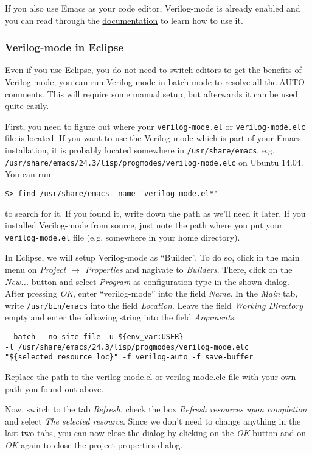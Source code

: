 If you also use Emacs as your code editor,
Verilog-mode is already enabled and you can read through the
\href{http://www.veripool.org/wiki/verilog-mode/Documentation}{documentation} to
learn how to use it.

\subsubsection{Verilog-mode in Eclipse}

Even if you use Eclipse, you do not need to switch editors to get the
benefits of Verilog-mode; you can run Verilog-mode in batch mode to
resolve all the AUTO comments. This will require some manual setup, but
afterwards it can be used quite easily.

First, you need to figure out where your \verb|verilog-mode.el| or
\verb|verilog-mode.elc| file is located. If you want to use the
Verilog-mode which is part of your Emacs installation, it is probably located
somewhere in \verb|/usr/share/emacs|, e.g.
\verb|/usr/share/emacs/24.3/lisp/progmodes/verilog-mode.elc| on Ubuntu 14.04.
You can run
\begin{verbatim}
$> find /usr/share/emacs -name 'verilog-mode.el*'
\end{verbatim}
to search for it. If you found it, write down the path as we'll need it later.
If you installed Verilog-mode from source, just note the path where you put
your \verb|verilog-mode.el| file (e.g. somewhere in your home directory).

In Eclipse, we will setup Verilog-mode as ``Builder''. To do so, click in the
main menu on \emph{Project $\rightarrow$ Properties} and nagivate to
\emph{Builders}. There, click on the \emph{New...} button and select
\emph{Program} as configuration type in the shown dialog. After pressing
\emph{OK}, enter ``verilog-mode'' into the field \emph{Name}. In the \emph{Main}
tab, write \verb|/usr/bin/emacs| into the field \emph{Location}. Leave the field
\emph{Working Directory} empty and enter the following string into the field
\emph{Arguments}:
\begin{verbatim}
--batch --no-site-file -u ${env_var:USER}
-l /usr/share/emacs/24.3/lisp/progmodes/verilog-mode.elc
"${selected_resource_loc}" -f verilog-auto -f save-buffer
\end{verbatim}

Replace the path to the verilog-mode.el or verilog-mode.elc file with your own
path you found out above.

Now, switch to the tab \emph{Refresh}, check the box \emph{Refresh resources
upon completion} and select \emph{The selected resource}. Since we don't need
to change anything in the last two tabs, you can now close the dialog by
clicking on the \emph{OK} button and on \emph{OK} again to close the project
properties dialog.

